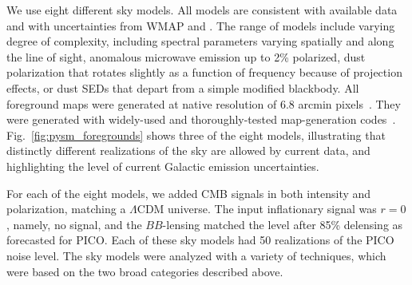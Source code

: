 \documentclass[PICOReport.tex]{subfiles}
\begin{document}
We use eight different sky models. All models are consistent with available data and with uncertainties from WMAP and \planck . The range of models include varying degree of complexity, including spectral parameters varying spatially and along the line of sight, anomalous microwave emission up to 2\% polarized, dust polarization that rotates slightly as a function of frequency because of projection effects, or dust \ac{SED}s that depart from a simple modified blackbody. All foreground maps were generated at native resolution of 6.8 arcmin pixels~\citep{gorski/etal:2005}. They were generated with widely-used and thoroughly-tested map-generation codes~\citep{thorne2018_pysm,delabrouille/etal:2013}. Fig.~\ref{fig:pysm_foregrounds} shows three of the eight models, illustrating that distinctly different realizations of the sky are allowed by current data, and highlighting the level of current Galactic emission uncertainties. 

For each of the eight models, we added CMB signals in both intensity and polarization, matching a $\Lambda$CDM universe. The input inflationary signal was $r=0$, namely, no signal, and the $BB$-lensing matched the level after 85\% delensing as forecasted for PICO. Each of these sky models had 50 realizations of the PICO noise level. 
The sky models were analyzed with a variety of techniques, which were based on the two broad categories described above. 

\end{document}
